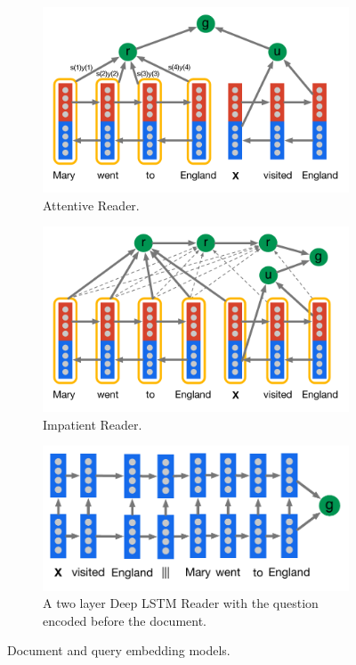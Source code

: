 \begin{figure}
\centering
  \begin{subfigure}[b]{0.49\textwidth}
    \centering
    \includegraphics[scale=0.44]{figs/AttentiveReader.pdf}
    \caption{Attentive Reader.}
  \end{subfigure}
  \begin{subfigure}[b]{0.49\textwidth}
    \centering
    \includegraphics[scale=0.44]{figs/ImpatientReader.pdf}
    \caption{Impatient Reader.}
  \end{subfigure}
  \begin{subfigure}[b]{1.0\textwidth}
    \centering
    \includegraphics[scale=0.44]{figs/BiLSTMRev.pdf}
    \caption{A two layer Deep LSTM Reader with the question encoded before
             the document.}
  \end{subfigure}
  \caption{Document and query embedding models.}
\label{fig:models}
\end{figure}

